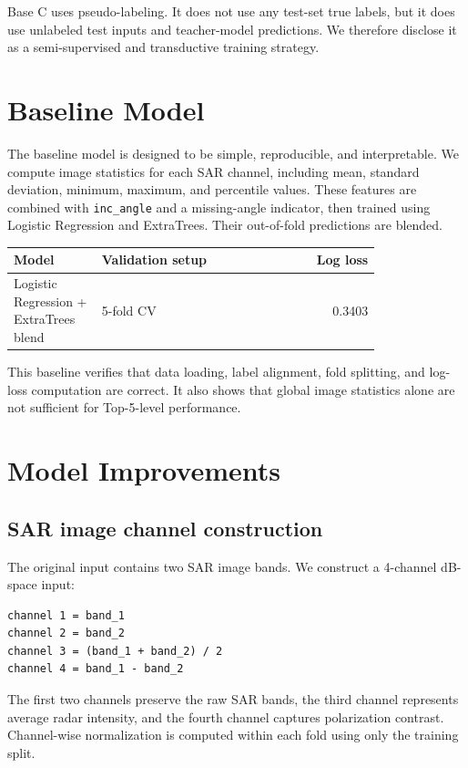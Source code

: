 \documentclass[11pt]{article}
\begin{document}
Base C uses pseudo-labeling. It does not use any test-set true labels, but it does use unlabeled test inputs and teacher-model predictions. We therefore disclose it as a semi-supervised and transductive training strategy.

\section{Baseline Model}

The baseline model is designed to be simple, reproducible, and interpretable. We compute image statistics for each SAR channel, including mean, standard deviation, minimum, maximum, and percentile values. These features are combined with \texttt{inc\_angle} and a missing-angle indicator, then trained using Logistic Regression and ExtraTrees. Their out-of-fold predictions are blended.

\begin{center}
\begin{tabular}{p{0.24\linewidth}p{0.56\linewidth}r}
\toprule
Model & Validation setup & Log loss \\
\midrule
Logistic Regression + ExtraTrees blend & 5-fold CV & 0.3403 \\
\bottomrule
\end{tabular}
\end{center}

This baseline verifies that data loading, label alignment, fold splitting, and log-loss computation are correct. It also shows that global image statistics alone are not sufficient for Top-5-level performance.

\section{Model Improvements}

\subsection{SAR image channel construction}

The original input contains two SAR image bands. We construct a 4-channel dB-space input:

\begin{lstlisting}
channel 1 = band_1
channel 2 = band_2
channel 3 = (band_1 + band_2) / 2
channel 4 = band_1 - band_2
\end{lstlisting}

The first two channels preserve the raw SAR bands, the third channel represents average radar intensity, and the fourth channel captures polarization contrast. Channel-wise normalization is computed within each fold using only the training split.
\end{document}
